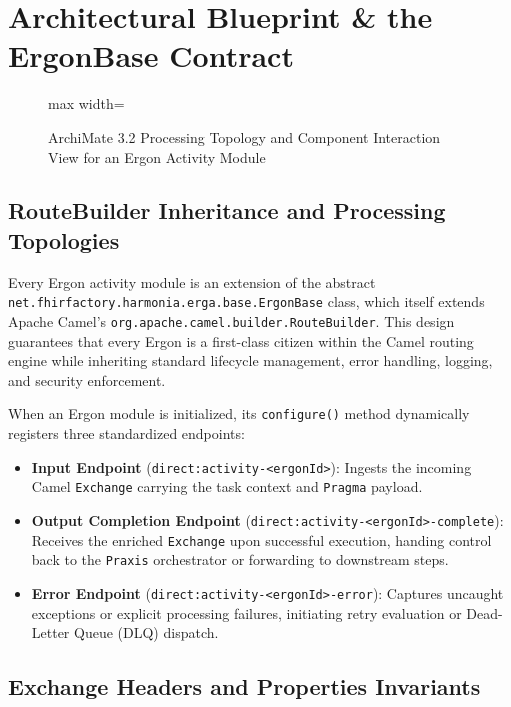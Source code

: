\section{Architectural Blueprint \& the ErgonBase Contract}
\label{sec:ergon_contract}

\begin{figure}[htbp]
    \centering
    \begin{adjustbox}{max width=\textwidth}
        
    \end{adjustbox}
    \caption{ArchiMate 3.2 Processing Topology and Component Interaction View for an Ergon Activity Module}
    \label{fig:ergon_module_architecture}
\end{figure}

\subsection{RouteBuilder Inheritance and Processing Topologies}

Every Ergon activity module is an extension of the abstract \texttt{net.fhirfactory.harmonia.erga.base.ErgonBase} class, which itself extends Apache Camel's \texttt{org.apache.camel.builder.RouteBuilder}. This design guarantees that every Ergon is a first-class citizen within the Camel routing engine while inheriting standard lifecycle management, error handling, logging, and security enforcement.

When an Ergon module is initialized, its \texttt{configure()} method dynamically registers three standardized endpoints:
\begin{itemize}
    \item \textbf{Input Endpoint} (\texttt{direct:activity-<ergonId>}): Ingests the incoming Camel \texttt{Exchange} carrying the task context and \texttt{Pragma} payload.
    \item \textbf{Output Completion Endpoint} (\texttt{direct:activity-<ergonId>-complete}): Receives the enriched \texttt{Exchange} upon successful execution, handing control back to the \texttt{Praxis} orchestrator or forwarding to downstream steps.
    \item \textbf{Error Endpoint} (\texttt{direct:activity-<ergonId>-error}): Captures uncaught exceptions or explicit processing failures, initiating retry evaluation or Dead-Letter Queue (DLQ) dispatch.
\end{itemize}

\subsection{Exchange Headers and Properties Invariants}

